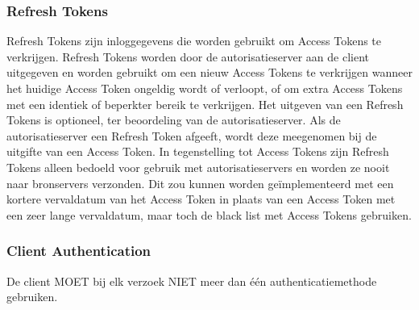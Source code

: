 \subsubsection{Refresh Tokens}%
\label{subsubsec:refresh-tokens}
Refresh Tokens zijn inloggegevens die worden gebruikt om Access Tokens te verkrijgen. Refresh Tokens worden door de autorisatieserver aan de client uitgegeven en worden gebruikt om een nieuw Access Tokens te verkrijgen wanneer het huidige Access Token ongeldig wordt of verloopt, of om extra Access Tokens met een identiek of beperkter bereik te verkrijgen. Het uitgeven van een Refresh Tokens is optioneel, ter beoordeling van de autorisatieserver. Als de autorisatieserver een Refresh Token afgeeft, wordt deze meegenomen bij de uitgifte van een Access Token. In tegenstelling tot Access Tokens zijn Refresh Tokens alleen bedoeld voor gebruik met autorisatieservers en worden ze nooit naar bronservers verzonden.
Dit zou kunnen worden geïmplementeerd met een kortere vervaldatum van het Access Token in plaats van een Access Token met een zeer lange vervaldatum, maar toch de black list met Access Tokens gebruiken.
\subsubsection{Client Authentication}
De client MOET bij elk verzoek NIET meer dan één authenticatiemethode gebruiken.

